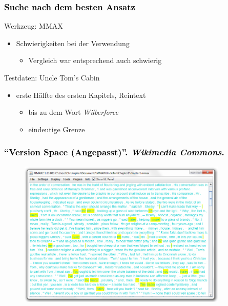 \documentclass[xcolor=dvipsnames]{beamer}
\begin{document}
\begin{frame}\frametitle{\textcolor{black}{Suche nach dem besten Ansatz}}

\begin{block}{Werkzeug: MMAX}
\begin{itemize}
\item Schwierigkeiten bei der Verwendung
\begin{itemize}
\item Vergleich war entsprechend auch schwierig
\end{itemize}
\end{itemize}
\end{block}

\begin{block}{Testdaten: Uncle Tom's Cabin}
\begin{itemize}
\item erste Hälfte des ersten Kapitels, Reintext
\begin{itemize}
\item bis zu dem Wort \emph{Wilberforce}
\item eindeutige Grenze
\end{itemize}
\end{itemize}
\end{block}

\end{frame}


\begin{frame}\frametitle{\textcolor{black}{``{Version Space (Angepasst)}''. \emph{Wikimedia Commons}.}}
\begin{figure}
\includegraphics[height=7cm]{cm_mmax.jpg}
\end{figure}

\end{frame}

\end{document}
